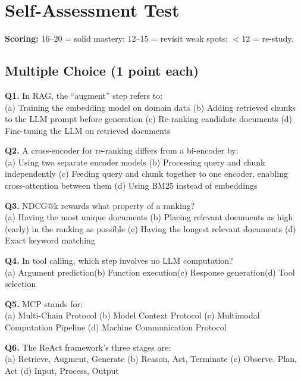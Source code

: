 \documentclass[11pt, a4paper]{article}
\begin{document}
\newpage
\section{Self-Assessment Test}

\textbf{Scoring:} 16--20 = solid mastery; 12--15 = revisit weak spots; $<$12 = re-study.

\subsection*{Multiple Choice (1 point each)}

\textbf{Q1.} In RAG, the ``augment'' step refers to:\\
(a) Training the embedding model on domain data\quad
(b) Adding retrieved chunks to the LLM prompt before generation\quad
(c) Re-ranking candidate documents\quad
(d) Fine-tuning the LLM on retrieved documents

\textbf{Q2.} A cross-encoder for re-ranking differs from a bi-encoder by:\\
(a) Using two separate encoder models\quad
(b) Processing query and chunk independently\quad
(c) Feeding query and chunk together to one encoder, enabling cross-attention between them\quad
(d) Using BM25 instead of embeddings

\textbf{Q3.} NDCG@k rewards what property of a ranking?\\
(a) Having the most unique documents\quad
(b) Placing relevant documents as high (early) in the ranking as possible\quad
(c) Having the longest relevant documents\quad
(d) Exact keyword matching

\textbf{Q4.} In tool calling, which step involves no LLM computation?\\
(a) Argument prediction\quad (b) Function execution\quad (c) Response generation\quad (d) Tool selection

\textbf{Q5.} MCP stands for:\\
(a) Multi-Chain Protocol\quad
(b) Model Context Protocol\quad
(c) Multimodal Computation Pipeline\quad
(d) Machine Communication Protocol

\textbf{Q6.} The ReAct framework's three stages are:\\
(a) Retrieve, Augment, Generate\quad
(b) Reason, Act, Terminate\quad
(c) Observe, Plan, Act\quad
(d) Input, Process, Output
\end{document}
